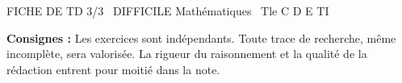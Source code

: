 \documentclass[11pt]{article}
\begin{document}
\begin{tcolorbox}[enhanced,colback=popink,colframe=popink,arc=10pt,boxrule=0pt,left=12pt,right=12pt,top=9pt,bottom=9pt]
{\color{white}\popxbold\small FICHE DE TD 3/3 \textbullet\ DIFFICILE \hfill Mathématiques \textbullet\ Tle C D E TI\par}
\end{tcolorbox}
\vspace{4pt}
\noindent \textbf{Consignes :} Les exercices sont indépendants. Toute trace de recherche, même incomplète, sera valorisée. La rigueur du raisonnement et la qualité de la rédaction entrent pour moitié dans la note.
\end{document}
